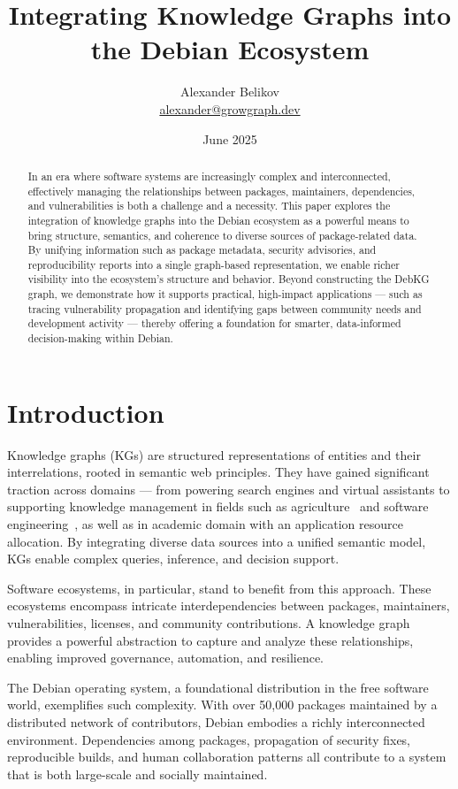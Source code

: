 \documentclass[10pt,oneside,a4paper, twocolumn]{article}
\title{Integrating Knowledge Graphs into the Debian Ecosystem}
\author{Alexander Belikov \\ \href{mailto:alexander@growgraph.dev}{alexander@growgraph.dev}}
\date{June 2025}
\begin{document}
    \maketitle

    \begin{abstract}
        In an era where software systems are increasingly complex and interconnected, effectively managing the relationships between packages, maintainers, dependencies, and vulnerabilities is both a challenge and a necessity.
        This paper explores the integration of knowledge graphs into the Debian ecosystem as a powerful means to bring structure, semantics, and coherence to diverse sources of package-related data.
        By unifying information such as package metadata, security advisories, and reproducibility reports into a single graph-based representation, we enable richer visibility into the ecosystem's structure and behavior.
        Beyond constructing the DebKG graph, we demonstrate how it supports practical, high-impact applications — such as tracing vulnerability propagation and identifying gaps between community needs and development activity — thereby offering a foundation for smarter, data-informed decision-making within Debian.
    \end{abstract}


    \section{Introduction}
    Knowledge graphs (KGs) are structured representations of entities and their interrelations, rooted in semantic web principles.
    They have gained significant traction across domains — from powering search engines and virtual assistants to supporting knowledge management in fields such as agriculture~\cite{Min2022-ff} and software engineering~\cite{Chen2023-pe}, as well as in academic domain with an application resource allocation\cite{xsi}.
    By integrating diverse data sources into a unified semantic model, KGs enable complex queries, inference, and decision support.

    Software ecosystems, in particular, stand to benefit from this approach.
    These ecosystems encompass intricate interdependencies between packages, maintainers, vulnerabilities, licenses, and community contributions.
    A knowledge graph provides a powerful abstraction to capture and analyze these relationships, enabling improved governance, automation, and resilience.

    The Debian operating system, a foundational distribution in the free software world, exemplifies such complexity.
    With over 50,000 packages maintained by a distributed network of contributors, Debian embodies a richly interconnected environment.
    Dependencies among packages, propagation of security fixes, reproducible builds, and human collaboration patterns all contribute to a system that is both large-scale and socially maintained.
\end{document}
